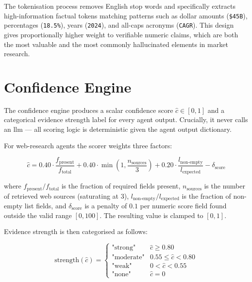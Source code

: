 \documentclass[12pt,a4paper,oneside]{book}
\begin{document}
The tokenisation process removes English stop words and specifically extracts high-information factual tokens matching patterns such as dollar amounts (\texttt{\$45B}), percentages (\texttt{18.5\%}), years (\texttt{2024}), and all-caps acronyms (\texttt{CAGR}). This design gives proportionally higher weight to verifiable numeric claims, which are both the most valuable and the most commonly hallucinated elements in market research.

\section{Confidence Engine}

The confidence engine produces a scalar confidence score $\hat{c} \in [0, 1]$ and a categorical evidence strength label for every agent output. Crucially, it never calls an \gls{llm} — all scoring logic is deterministic given the agent output dictionary.

For web-research agents the scorer weights three factors:

\begin{equation}
  \hat{c} = 0.40 \cdot \frac{f_\text{present}}{f_\text{total}}
           + 0.40 \cdot \min\!\left(1, \frac{n_\text{sources}}{3}\right)
           + 0.20 \cdot \frac{l_\text{non-empty}}{l_\text{expected}}
           - \delta_\text{score}
  \label{eq:confidence}
\end{equation}

where $f_\text{present}/f_\text{total}$ is the fraction of required fields present, $n_\text{sources}$ is the number of retrieved web sources (saturating at 3), $l_\text{non-empty}/l_\text{expected}$ is the fraction of non-empty list fields, and $\delta_\text{score}$ is a penalty of $0.1$ per numeric score field found outside the valid range $[0, 100]$. The resulting value is clamped to $[0, 1]$.

Evidence strength is then categorised as follows:

\begin{equation}
  \text{strength}(\hat{c}) =
  \begin{cases}
    \text{"strong"}   & \hat{c} \geq 0.80 \\
    \text{"moderate"} & 0.55 \leq \hat{c} < 0.80 \\
    \text{"weak"}     & 0 < \hat{c} < 0.55 \\
    \text{"none"}     & \hat{c} = 0
  \end{cases}
\end{equation}
\end{document}
